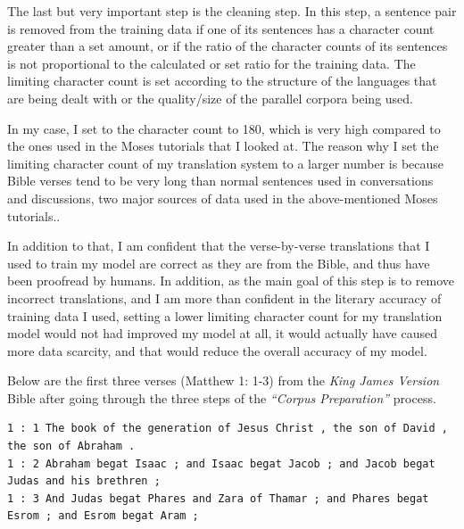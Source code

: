 The last but very important step is the cleaning step. In this step, a sentence pair is removed from the training data if one of its sentences has a character count greater than a set amount, or if the ratio of the character counts of its sentences is not proportional to the calculated or set ratio for the training data. The limiting character count is set according to the structure of the languages that are being dealt with or the quality/size of the parallel corpora being used. 

In my case, I set to the character count to 180, which is very high compared to the ones used in the Moses tutorials that I looked at\cite{koehn2010moses, mosesbaselinesystem}. The reason why I set the limiting character count of my translation system to a larger number is because Bible verses tend to be very long than normal sentences used in conversations and discussions, two major sources of data used in the above-mentioned Moses tutorials.\cite{koehn2010moses, mosesbaselinesystem}.

In addition to that, I am confident that the verse-by-verse translations that I used to train my model are correct as they are from the Bible, and thus have been proofread by humans. In addition, as the main goal of this step is to remove incorrect translations, and I am more than confident in the literary accuracy of training data I used, setting a lower limiting character count for my translation model would not had improved my model at all, it would actually have caused more data scarcity, and that would reduce the overall accuracy of my model.

Below are the first three verses (Matthew 1: 1-3) from the \textit{King James Version} Bible after going through the three steps of the \textit{``Corpus Preparation''} process.
\begin{lstlisting}
1 : 1 The book of the generation of Jesus Christ , the son of David , the son of Abraham .
1 : 2 Abraham begat Isaac ; and Isaac begat Jacob ; and Jacob begat Judas and his brethren ;
1 : 3 And Judas begat Phares and Zara of Thamar ; and Phares begat Esrom ; and Esrom begat Aram ;
\end{lstlisting}


